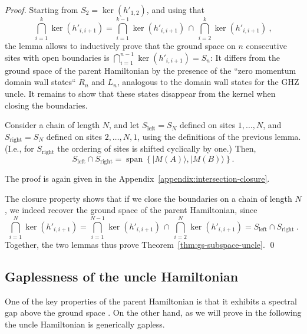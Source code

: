 \documentclass[cmp]{svjour}
\newcommand{\ket}[1]{|#1\rangle}
\DeclareMathOperator{\spanned}{span}
\begin{document}
\begin{proof}
    Starting from $S_2=\ker(h'_{1,2})$, and using that
    \[
        \bigcap_{i=1}^{k} \ker(h'_{i,i+1}) =
        \bigcap_{i=1}^{k-1} \ker(h'_{i,i+1}) \,\cap\,
        \bigcap_{i=2}^{k} \ker(h'_{i,i+1})\ ,
    \]
    the lemma allows to inductively prove that the ground
    space on $n$ consecutive sites with open boundaries is
    $\bigcap_{i=1}^{n-1}\ker(h'_{i,i+1}) = S_n$:  It differs from the ground space of the
    parent Hamiltonian by the presence of the ``zero momentum domain wall
    states`` $R_n$ and $L_n$, analogous to the domain wall states for the GHZ
    uncle. It remains to show that these states disappear from the kernel when closing the
    boundaries.




    \begin{lemma}
        \label{lemma:closure}
        Consider a chain of length $N$, and let $S_\mathrm{left}=S_N$ defined on
        sites $1,\dots,N$, and $S_\mathrm{right}=S_N$ defined on sites
        $2,\dots,N,1$, using the definitions of the previous lemma. (I.e., for
        $S_\mathrm{right}$ the ordering of sites is shifted cyclically by one.)
        Then,
        \[
            S_\mathrm{left}\cap S_\mathrm{right} = \spanned\left\{\ket{M(A)},\ket{M(B)}\right\}.
        \]
    \end{lemma}
    The proof is again given in the Appendix~\ref{appendix:intersection-closure}.

    The closure property shows that if we close the boundaries on a chain of
    length $N$, we indeed recover the ground space of the parent Hamiltonian,
    since
    \[
        \bigcap_{i=1}^{N} \ker(h'_{i,i+1}) =
        \bigcap_{i=1}^{N-1} \ker(h'_{i,i+1}) \,\cap\,
        \bigcap_{i=2}^{N} \ker(h'_{i,i+1}) = S_\mathrm{left}\cap S_\mathrm{right}\ .
    \]
    Together, the two lemmas thus prove Theorem~\ref{thm:gs-subspace-uncle}.
    \hspace*{\fill}\qed
\end{proof}




\subsection{Gaplessness of the uncle Hamiltonian}

One of the key properties of the parent Hamiltonian is that it exhibits a
spectral gap above the ground space \cite{nachtergaele:spectralgap}. On
the other hand, as we will prove in the following the uncle Hamiltonian is
generically gapless.
\end{document}
